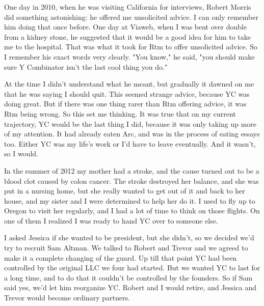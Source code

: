 One day in 2010,
                  when he was visiting California for interviews, Robert Morris
                  did something astonishing: he offered me unsolicited advice. I
                  can only remember him doing that once before. One day at
                  Viaweb, when I was bent over double from a kidney stone, he
                  suggested that it would be a good idea for him to take me to
                  the hospital. That was what it took for Rtm to offer
                  unsolicited advice. So I remember his exact words very
                  clearly. "You know," he said, "you should make sure Y
                  Combinator isn't the last cool thing you do."

At
                  the time I didn't understand what he meant, but gradually it
                  dawned on me that he was saying I should quit. This seemed
                  strange advice, because YC was doing great. But if there was
                  one thing rarer than Rtm offering advice, it was Rtm being
                  wrong. So this set me thinking. It was true that on my current
                  trajectory, YC would be the last thing I did, because it was
                  only taking up more of my attention. It had already eaten Arc,
                  and was in the process of eating essays too. Either YC was my
                  life's work or I'd have to leave eventually. And it wasn't, so
                  I would.

In the summer of 2012 my mother had a
                  stroke, and the cause turned out to be a blood clot caused by
                  colon cancer. The stroke destroyed her balance, and she was
                  put in a nursing home, but she really wanted to get out of it
                  and back to her house, and my sister and I were determined to
                  help her do it. I used to fly up to Oregon to visit her
                  regularly, and I had a lot of time to think on those flights.
                  On one of them I realized I was ready to hand YC over to
                  someone else.

I asked Jessica if she wanted to be
                  president, but she didn't, so we decided we'd try to recruit
                  Sam Altman. We talked to Robert and Trevor and we agreed to
                  make it a complete changing of the guard. Up till that point
                  YC had been controlled by the original LLC we four had
                  started. But we wanted YC to last for a long time, and to do
                  that it couldn't be controlled by the founders. So if Sam said
                  yes, we'd let him reorganize YC. Robert and I would retire,
                  and Jessica and Trevor would become ordinary partners.

